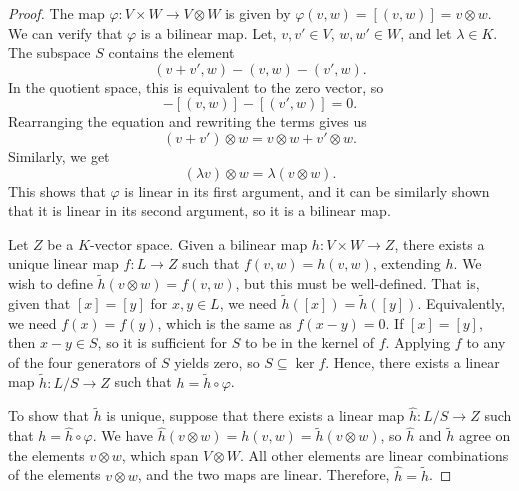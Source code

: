 \documentclass[a4paper,12pt]{article}
\begin{document}
\begin{proof}
    The map $\varphi \colon V \times W \to V \otimes W$ is given by $\varphi(v, w) = [(v, w)] = v \otimes w$.
    We can verify that $\varphi$ is a bilinear map.
    Let, $v, v' \in V$, $w, w' \in W$, and let $\lambda \in K$.
    The subspace $S$ contains the element
    \begin{equation*}
        (v + v', w) - (v, w) - (v', w).
    \end{equation*}
    In the quotient space, this is equivalent to the zero vector, so
    \begin{equation*}
        [(v + v', w)] - [(v, w)] - [(v', w)] = 0.
    \end{equation*}
    Rearranging the equation and rewriting the terms gives us
    \begin{equation*}
        (v + v') \otimes w = v \otimes w + v' \otimes w.
    \end{equation*}
    Similarly, we get
    \begin{equation*}
        (\lambda v) \otimes w = \lambda (v \otimes w).
    \end{equation*}
    This shows that $\varphi$ is linear in its first argument, and it can be similarly shown that it is linear in its second argument, so it is a bilinear map.

    Let $Z$ be a $K$-vector space.
    Given a bilinear map $h \colon V \times W \to Z$, there exists a unique linear map $f \colon L \to Z$ such that $f(v, w) = h(v, w)$, extending $h$.
    We wish to define $\tilde{h}(v \otimes w) = f(v, w)$, but this must be well-defined.
    That is, given that $[x] = [y]$ for $x, y \in L$, we need $\tilde{h}([x]) = \tilde{h}([y])$.
    Equivalently, we need $f(x) = f(y)$, which is the same as $f(x - y) = 0$.
    If $[x] = [y]$, then $x - y \in S$, so it is sufficient for $S$ to be in the kernel of $f$.
    Applying $f$ to any of the four generators of $S$ yields zero, so $S \subseteq \ker f$.
    Hence, there exists a linear map $\tilde{h} \colon L/S \to Z$ such that $h = \tilde{h} \circ \varphi$.

    To show that $\tilde{h}$ is unique, suppose that there exists a linear map $\hat{h} \colon L/S \to Z$ such that $h = \hat{h} \circ \varphi$.
    We have $\hat{h}(v \otimes w) = h(v, w) = \tilde{h}(v \otimes w)$, so $\hat{h}$ and $\tilde{h}$ agree on the elements $v \otimes w$, which span $V \otimes W$.
    All other elements are linear combinations of the elements $v \otimes w$, and the two maps are linear.
    Therefore, $\hat{h} = \tilde{h}$.
\end{proof}
\end{document}
